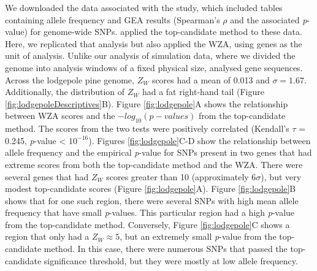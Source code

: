 \documentclass[10pt,twoside,lineno, twocolumn]{GSA_format}
\begin{document}
We downloaded the data associated with the \cite{Yeaman2016} study, which included tables containing allele frequency and GEA results (Spearman's $\rho$ and the associated \textit{p}-value) for genome-wide SNPs. \cite{Yeaman2016} applied the top-candidate method to these data. Here, we replicated that analysis but also applied the WZA, using genes as the unit of analysis. Unlike our analysis of simulation data, where we divided the genome into analysis windows of a fixed physical size, \cite{Yeaman2016} analysed gene sequences. \\

Across the lodgepole pine genome, $Z_W$ scores had a mean of 0.013 and $\sigma = 1.67$. Additionally, the distribution of $Z_W$ had a fat right-hand tail (Figure \ref{fig:lodgepoleDescriptives}B). Figure \ref{fig:lodgepole}A shows the relationship between WZA scores and the $-log_{10}(p-values)$ from the top-candidate method. The scores from the two tests were positively correlated (Kendall's $\tau$ = 0.245, \textit{p}-value < $10^{-16}$). Figures \ref{fig:lodgepole}C-D show the relationship between allele frequency and the empirical \textit{p}-value for SNPs present in two genes that had extreme scores from both the top-candidate method and the WZA. There were several genes that had $Z_W$ scores greater than 10 (approximately $6\sigma$), but very modest top-candidate scores (Figure \ref{fig:lodgepole}A). Figure \ref{fig:lodgepole}B shows that for one such region, there were several SNPs with high mean allele frequency that have small \textit{p}-values. This particular region had a high \textit{p}-value from the top-candidate method. Conversely, Figure \ref{fig:lodgepole}C shows a region that only had a $Z_W\approx5$, but an extremely small \textit{p}-value from the top-candidate method. In this case, there were numerous SNPs that passed the top-candidate significance threshold, but they were mostly at low allele frequency.
\end{document}
